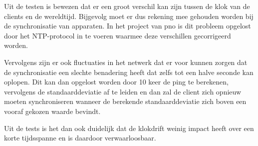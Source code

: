 Uit de testen is bewezen dat er een groot verschil kan zijn tussen de klok van de clients en de wereldtijd. Bijgevolg moet er dus rekening mee gehouden worden bij de synchronisatie van apparaten. In het project van pno is dit probleem opgelost door het NTP-protocol in te voeren waarmee deze verschillen gecorrigeerd worden.

Vervolgens zijn er ook fluctuaties in het netwerk dat er voor kunnen zorgen dat de synchronisatie een slechte benadering heeft dat zelfs tot een halve seconde kan oplopen. Dit kan dan opgelost worden door 10 keer de ping te berekenen, vervolgens de standaarddeviatie af te leiden en dan zal de client zich opnieuw moeten synchroniseren wanneer de berekende standaarddeviatie zich boven een vooraf gekozen waarde bevindt.

Uit de tests is het dan ook duidelijk dat de klokdrift weinig impact heeft over een korte tijdsspanne en is daardoor verwaarloosbaar.
